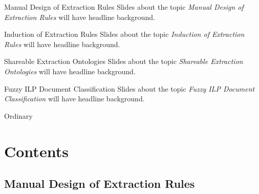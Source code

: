 \documentclass[xcolor=dvipsnames]{beamer}
\begin{document}
\begin{frame}{Manual Design of Extraction Rules}
Slides about the topic \emph{Manual Design of Extraction Rules} will have   headline background.
\end{frame}

\begin{frame}{Induction of Extraction Rules}
Slides about the topic \emph{Induction of Extraction Rules} will have   headline background.
\end{frame}

\begin{frame}{Shareable Extraction Ontologies}
Slides about the topic \emph{Shareable Extraction Ontologies} will have   headline background.
\end{frame}

\begin{frame}{Fuzzy ILP Document Classification}
Slides about the topic \emph{Fuzzy ILP Document Classification} will have   headline background.
\end{frame}

\resetcolor
\begin{frame}{Ordinary}
\end{frame}


\section{Contents}
\subsection{Manual Design of Extraction Rules}
\end{document}
